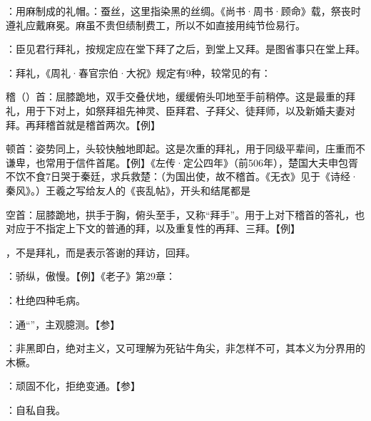 {
\item {}：用麻制成的礼帽。：蚕丝，这里指染黑的丝绸。《尚书·周书·顾命》载，祭丧时遵礼应戴麻冕。麻虽不贵但绩制费工，所以不如直接用纯节俭易行。
\item {}：臣见君行拜礼，按规定应在堂下拜了之后，到堂上又拜。是图省事只在堂上拜。%

：拜礼，《周礼·春官宗伯·大祝》规定有9种，较常见的有：
\begin{lyitemize}
\item 稽（）首：屈膝跪地，双手交叠伏地，缓缓俯头叩地至手前稍停。这是最重的拜礼，用于下对上，如祭拜祖先神灵、臣拜君、子拜父、徒拜师，以及新婚夫妻对拜。再拜稽首就是稽首两次。【例】
\item 顿首：姿势同上，头较快触地即起。这是次重的拜礼，用于同级平辈间，庄重而不谦卑，也常用于信件首尾。【例】《左传·定公四年》（前506年），楚国大夫申包胥不饮不食7日哭于秦廷，求兵救楚：（为国出使，故不稽首。《无衣》见于《诗经·秦风》。）王羲之写给友人的《丧乱帖》，开头和结尾都是  %
\item {}空首：屈膝跪地，拱手于胸，俯头至手，又称“拜手”。用于上对下稽首的答礼，也对应于不指定上下文的普通的拜，以及重复性的再拜、三拜。【例】  
\end{lyitemize}
 ，不是拜礼，而是表示答谢的拜访，回拜。
\item {}：骄纵，傲慢。【例】《老子》第29章：
}
{}


{
\item {}：杜绝四种毛病。
\item {}：通“”，主观臆测。【参】
\item {}：非黑即白，绝对主义，又可理解为死钻牛角尖，非怎样不可，其本义为分界用的木橛。%
\item {}：顽固不化，拒绝变通。【参】
\item {}：自私自我。
}
{}


